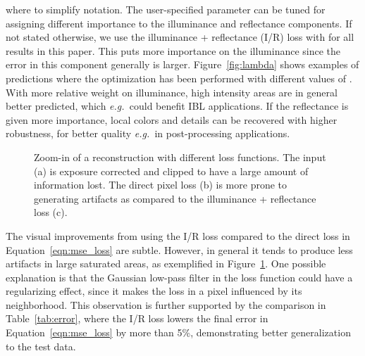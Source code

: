 \documentclass[acmtog]{acmart}
\newcommand{\figref}[1]{Figure~\ref{fig:#1}}
\newcommand{\tabref}[1]{Table~\ref{tab:#1}}
\newcommand{\eqnref}[1]{Equation~\ref{eqn:#1}}
\newcommand{\eg}{\emph{e.g.\ }}
\newcommand\belowfigspace{-2pt}
\begin{document}
where  to simplify notation. The user-specified parameter  can be tuned for assigning different importance to the illuminance and reflectance components. If not stated otherwise, we use the illuminance + reflectance (I/R) loss with  for all results in this paper. This puts more importance on the illuminance since the error in this component generally is larger. 
\figref{lambda} shows examples of predictions where the optimization has been performed with different values of . With more relative weight on illuminance, high intensity areas are in general better predicted, which \eg could benefit IBL applications. If the reflectance is given more importance, local colors and details can be recovered with higher robustness, for better quality \eg in post-processing applications.

\begin{figure}[t]
	\newcommand\ww{0.116}
	\centering
	\vspace{-10pt}
	\caption{\label{fig:loss} Zoom-in of a reconstruction with different loss functions. The input (a) is exposure corrected and clipped to have a large amount of information lost. The direct pixel loss (b) is more prone to generating artifacts as compared to the illuminance + reflectance loss (c).}
	\vspace{\belowfigspace}
\end{figure}

The visual improvements from using the I/R loss compared to the direct loss in \eqnref{mse_loss} are subtle. However, in general it tends to produce less artifacts in large saturated areas, as exemplified in \figref{loss}. One possible explanation is that the Gaussian low-pass filter in the loss function could have a regularizing effect, since it makes the loss in a pixel influenced by its neighborhood. This observation is further supported by the comparison in \tabref{error}, where the I/R loss lowers the final error in \eqnref{mse_loss} by more than 5\%, demonstrating better generalization to the test data.
 
\end{document}
